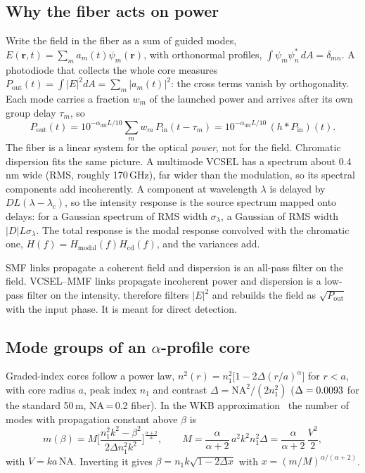 \subsection{Why the fiber acts on power}
Write the field in the fiber as a sum of guided modes, $E(\mathbf r,t)=\sum_ma_m(t)\psi_m(\mathbf r)$,
with orthonormal profiles, $\int\psi_m\psi_n^*\,dA=\delta_{mn}$. A photodiode that collects the whole core
measures $P_{\mathrm{out}}(t)=\int|E|^2dA=\sum_m|a_m(t)|^2$: the cross terms vanish by orthogonality. Each mode
carries a fraction $w_m$ of the launched power and arrives after its own group delay $\tau_m$, so
\begin{equation}
  P_{\mathrm{out}}(t)=10^{-\alpha_{\mathrm{dB}}L/10}\sum_mw_m\,P_{\mathrm{in}}(t-\tau_m)
  =10^{-\alpha_{\mathrm{dB}}L/10}\,(h*P_{\mathrm{in}})(t).
  \label{eq:mmf-power}
\end{equation}
The fiber is a linear system for the optical \emph{power}, not for the field. Chromatic dispersion
fits the same picture. A multimode VCSEL has a spectrum about 0.4\,nm wide (RMS, roughly 170\,GHz),
far wider than the modulation, so its spectral components add incoherently. A component at
wavelength $\lambda$ is delayed by $DL(\lambda-\lambda_c)$, so the intensity response is the source spectrum
mapped onto delays: for a Gaussian spectrum of RMS width $\sigma_\lambda$, a Gaussian of RMS width
$|D|L\sigma_\lambda$. The total response is the modal response convolved with the chromatic one,
$H(f)=H_{\mathrm{modal}}(f)H_{\mathrm{cd}}(f)$, and the variances add.

\begin{keypoint}
SMF links propagate a coherent field and dispersion is an all-pass filter on the field. VCSEL--MMF
links propagate incoherent power and dispersion is a low-pass filter on the intensity.
 therefore filters $|E|^2$ and rebuilds the field as $\sqrt{P_{\mathrm{out}}}$ with the
input phase. It is meant for direct detection.
\end{keypoint}

\subsection{Mode groups of an $\alpha$-profile core}
Graded-index cores follow a power law, $n^2(r)=n_1^2\big[1-2\Delta(r/a)^\alpha\big]$ for $r<a$, with core
radius $a$, peak index $n_1$ and contrast $\Delta=\mathrm{NA}^2/(2n_1^2)$ ($\Delta=0.0093$ for the standard 50\,\textmu m,
NA\,=\,0.2 fiber). In the WKB approximation~\cite{gloge1973} the number of modes with propagation
constant above $\beta$ is
\begin{equation}
  m(\beta)=M\Big[\frac{n_1^2k^2-\beta^2}{2\Delta n_1^2k^2}\Big]^{\frac{\alpha+2}{\alpha}},\qquad
  M=\frac{\alpha}{\alpha+2}\,a^2k^2n_1^2\Delta=\frac{\alpha}{\alpha+2}\,\frac{V^2}{2},
\end{equation}
with $V=ka\,\mathrm{NA}$. Inverting it gives $\beta=n_1k\sqrt{1-2\Delta x}$ with $x=(m/M)^{\alpha/(\alpha+2)}$.

